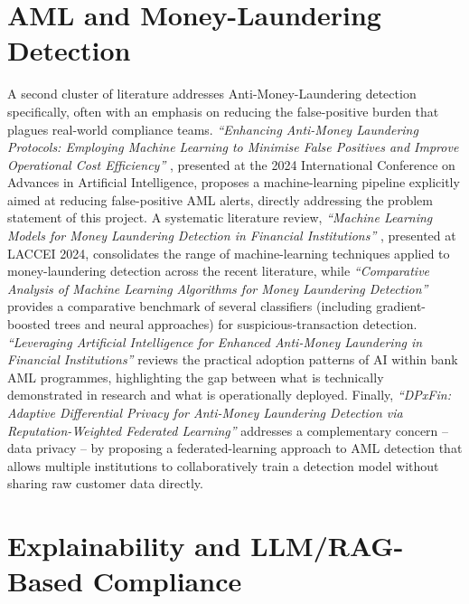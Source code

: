 \section{AML and Money-Laundering Detection}

A second cluster of literature addresses Anti-Money-Laundering detection specifically, often with an emphasis on reducing the false-positive burden that plagues real-world compliance teams. \textit{``Enhancing Anti-Money Laundering Protocols: Employing Machine Learning to Minimise False Positives and Improve Operational Cost Efficiency''} \cite{aml_ml2024}, presented at the 2024 International Conference on Advances in Artificial Intelligence, proposes a machine-learning pipeline explicitly aimed at reducing false-positive AML alerts, directly addressing the problem statement of this project. A systematic literature review, \textit{``Machine Learning Models for Money Laundering Detection in Financial Institutions''} \cite{aml_review2024}, presented at LACCEI 2024, consolidates the range of machine-learning techniques applied to money-laundering detection across the recent literature, while \textit{``Comparative Analysis of Machine Learning Algorithms for Money Laundering Detection''} \cite{aml_compare2025} provides a comparative benchmark of several classifiers (including gradient-boosted trees and neural approaches) for suspicious-transaction detection. \textit{``Leveraging Artificial Intelligence for Enhanced Anti-Money Laundering in Financial Institutions''} \cite{aml_leverage2026} reviews the practical adoption patterns of AI within bank AML programmes, highlighting the gap between what is technically demonstrated in research and what is operationally deployed. Finally, \textit{``DPxFin: Adaptive Differential Privacy for Anti-Money Laundering Detection via Reputation-Weighted Federated Learning''} \cite{dpxfin2026} addresses a complementary concern -- data privacy -- by proposing a federated-learning approach to AML detection that allows multiple institutions to collaboratively train a detection model without sharing raw customer data directly.

\section{Explainability and LLM/RAG-Based Compliance}

